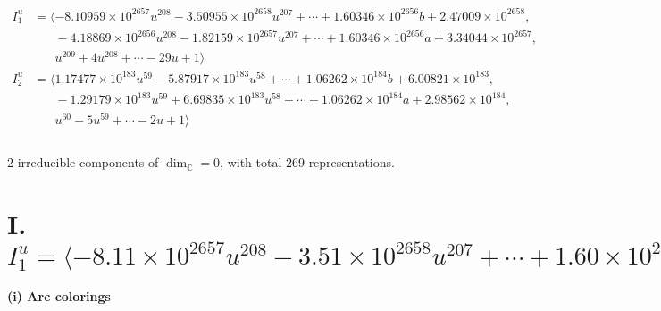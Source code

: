 \documentclass[1p]{elsarticle_modified}
\theoremstyle{definition}
\begin{document}
\begin{align*}
I^u_{1}&=\langle 
-8.10959\times10^{2657} u^{208}-3.50955\times10^{2658} u^{207}+\cdots+1.60346\times10^{2656} b+2.47009\times10^{2658},\\
\phantom{I^u_{1}}&\phantom{= \langle  }-4.18869\times10^{2656} u^{208}-1.82159\times10^{2657} u^{207}+\cdots+1.60346\times10^{2656} a+3.34044\times10^{2657},\\
\phantom{I^u_{1}}&\phantom{= \langle  }u^{209}+4 u^{208}+\cdots-29 u+1\rangle \\
I^u_{2}&=\langle 
1.17477\times10^{183} u^{59}-5.87917\times10^{183} u^{58}+\cdots+1.06262\times10^{184} b+6.00821\times10^{183},\\
\phantom{I^u_{2}}&\phantom{= \langle  }-1.29179\times10^{183} u^{59}+6.69835\times10^{183} u^{58}+\cdots+1.06262\times10^{184} a+2.98562\times10^{184},\\
\phantom{I^u_{2}}&\phantom{= \langle  }u^{60}-5 u^{59}+\cdots-2 u+1\rangle \\
\\
\end{align*}
\raggedright * 2 irreducible components of $\dim_{\mathbb{C}}=0$, with total 269 representations.\\
\newpage
\renewcommand{\arraystretch}{1}
\centering \section*{I. $I^u_{1}= \langle -8.11\times10^{2657} u^{208}-3.51\times10^{2658} u^{207}+\cdots+1.60\times10^{2656} b+2.47\times10^{2658},\;-4.19\times10^{2656} u^{208}-1.82\times10^{2657} u^{207}+\cdots+1.60\times10^{2656} a+3.34\times10^{2657},\;u^{209}+4 u^{208}+\cdots-29 u+1 \rangle$}
\flushleft \textbf{(i) Arc colorings}\\
\end{document}
